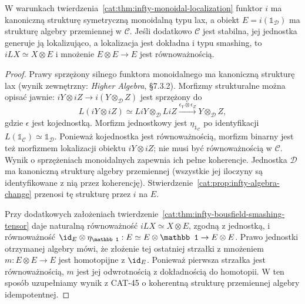 \begin{stwierdzenie}\label{cat:prop:infty-monoidal-localization-idempotent}
W warunkach twierdzenia~\ref{cat:thm:infty-monoidal-localization} funktor $i$ ma kanoniczną strukturę symetryczną monoidalną typu lax, a obiekt $E=i(\mathbb 1_{\mathcal D})$ ma strukturę algebry przemiennej w $\mathcal C$. Jeśli dodatkowo $\mathcal C$ jest stabilna, jej jednostka generuje ją lokalizująco, a lokalizacja jest dokładna i typu smashing, to $iLX\simeq X\otimes E$ i mnożenie $E\otimes E\to E$ jest równoważnością.
\end{stwierdzenie}
\begin{proof}
Prawy sprzężony silnego funktora monoidalnego ma kanoniczną strukturę lax (wynik zewnętrzny: \emph{Higher Algebra}, \S7.3.2). Morfizmy strukturalne można opisać jawnie: $iY\otimes iZ\to i(Y\otimes_{\mathcal D} Z)$ jest sprzężony do
\[
 L(iY\otimes iZ)\simeq LiY\otimes_{\mathcal D} LiZ
 \xrightarrow{\epsilon_Y\otimes\epsilon_Z}Y\otimes_{\mathcal D}Z,
\]
gdzie $\epsilon$ jest kojednostką. Morfizm jednostkowy jest $\eta_{\mathbb 1_{\mathcal C}}$ po identyfikacji $L(\mathbb 1_{\mathcal C})\simeq\mathbb 1_{\mathcal D}$. Ponieważ kojednostka jest równoważnością, morfizm binarny jest też morfizmem lokalizacji obiektu $iY\otimes iZ$; nie musi być równoważnością w $\mathcal C$. Wynik o sprzężeniach monoidalnych zapewnia ich pełne koherencje. Jednostka $\mathcal D$ ma kanoniczną strukturę algebry przemiennej (wszystkie jej iloczyny są identyfikowane z nią przez koherencję). Stwierdzenie~\ref{cat:prop:infty-algebra-change} przenosi tę strukturę przez $i$ na $E$.

Przy dodatkowych założeniach twierdzenie~\ref{cat:thm:infty-bousfield-smashing-tensor} daje naturalną równoważność $iLX\simeq X\otimes E$, zgodną z jednostką, i równoważność $\id_E\otimes\eta_{\mathbb 1}:E\simeq E\otimes\mathbb 1\to E\otimes E$. Prawo jednostki otrzymanej algebry mówi, że złożenie tej ostatniej strzałki z mnożeniem $m:E\otimes E\to E$ jest homotopijne z $\id_E$. Ponieważ pierwsza strzałka jest równoważnością, $m$ jest jej odwrotnością z dokładnością do homotopii. W ten sposób uzupełniamy wynik z CAT-45 o koherentną strukturę przemiennej algebry idempotentnej.
\end{proof}

